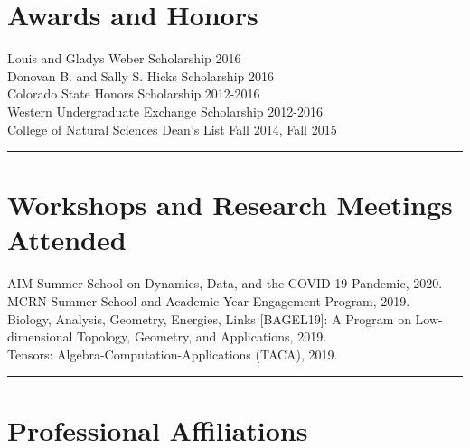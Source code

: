 \documentclass[12pt]{article} %
\begin{document}
\section{Awards and Honors}
\begin{flushleft}
Louis and Gladys Weber Scholarship \hfill 2016\\
\vspace*{5pt}
Donovan B. and Sally S. Hicks Scholarship \hfill 2016\\
\vspace*{5pt}
Colorado State Honors Scholarship \hfill 2012-2016\\
\vspace*{5pt}
Western Undergraduate Exchange Scholarship \hfill 2012-2016\\
\vspace*{5pt}
College of Natural Sciences Dean's List \hfill Fall 2014, Fall 2015\\
\vspace*{5pt}
\end{flushleft}
\rule{\textwidth}{0.5mm}


\section{Workshops and Research Meetings Attended}

\begin{flushleft}
AIM Summer School on Dynamics, Data, and the COVID-19 Pandemic, 2020.\\
\vspace*{5pt}
MCRN Summer School and Academic Year Engagement Program, 2019.\\
\vspace*{5pt}
Biology, Analysis, Geometry, Energies, Links [BAGEL19]: A Program on Low-dimensional Topology, Geometry, and Applications, 2019.\\
\vspace*{5pt}
Tensors: Algebra-Computation-Applications (TACA), 2019.\\
\end{flushleft}

\rule{\textwidth}{0.5mm}

\section{Professional Affiliations}
\end{document}
